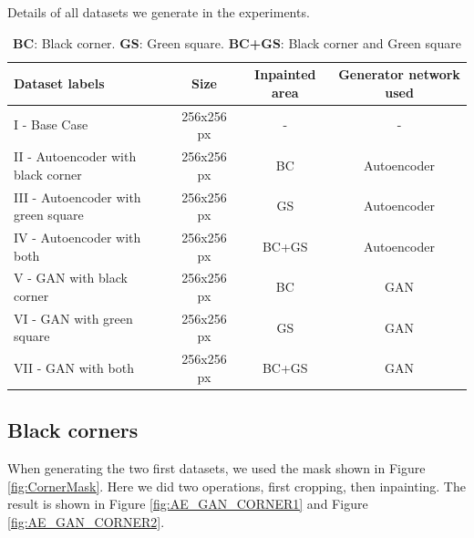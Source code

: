 \begin{table}[h]
\centering
\footnotesize
\caption{Details of all datasets we generate in the experiments.} 
\caption*{\small \textbf{BC}: Black corner. \textbf{GS}: Green square. \textbf{BC+GS}: Black corner and Green square}
\begin{center}
\begin{tabular}{lccc}
\toprule
{Dataset labels} & {Size} & {Inpainted area} & {Generator network used} \\ 
\midrule
I    - Base Case                       & 256x256 px         & -        & -                   \\
II   - Autoencoder with black corner   & 256x256 px         & BC       & Autoencoder         \\
III  - Autoencoder with green square   & 256x256 px         & GS       & Autoencoder         \\
IV   - Autoencoder with both           & 256x256 px         & BC+GS    & Autoencoder         \\
V    - GAN with black corner           & 256x256 px         & BC       & GAN                 \\
VI   - GAN with green square   		   & 256x256 px         & GS       & GAN                 \\
VII  - GAN with both                   & 256x256 px         & BC+GS    & GAN                 \\
\bottomrule
\end{tabular}%
\end{center}
\label{tab:datasets}
\end{table}

\FloatBarrier
\subsection{Black corners}
When generating the two first datasets, we used the mask shown in Figure \ref{fig:CornerMask}. Here we did two operations, first cropping, then inpainting. The result is shown in Figure \ref{fig:AE_GAN_CORNER1} and Figure \ref{fig:AE_GAN_CORNER2}.



